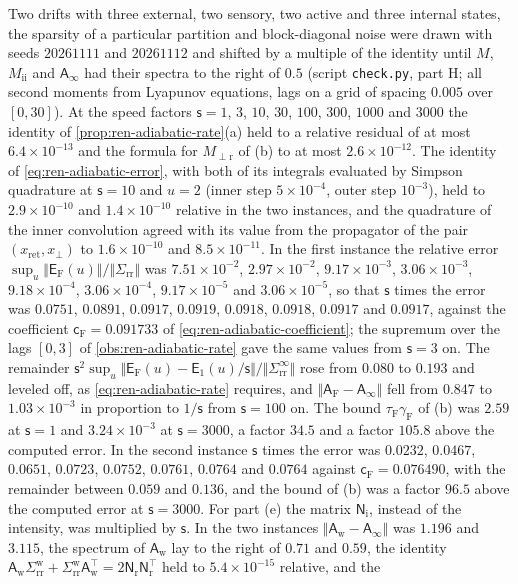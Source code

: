 \begin{numcheck}\label{chk:ren-adiabatic-rate}
Two drifts with three external, two sensory, two active and three internal states, the sparsity of a particular partition and block-diagonal noise were drawn with seeds $20261111$ and $20261112$ and shifted by a multiple of the identity until $M$, $M_{\mathrm{ii}}$ and $\mathsf A_\infty$ had their spectra to the right of $0.5$ (script \texttt{check.py}, part H; all second moments from Lyapunov equations, lags on a grid of spacing $0.005$ over $[0,30]$). At the speed factors $\mathsf s=1$, $3$, $10$, $30$, $100$, $300$, $1000$ and $3000$ the identity of \cref{prop:ren-adiabatic-rate}(a) held to a relative residual of at most $6.4\times10^{-13}$ and the formula for $M_{\perp\mathrm r}$ of (b) to at most $2.6\times10^{-12}$. The identity of \eqref{eq:ren-adiabatic-error}, with both of its integrals evaluated by Simpson quadrature at $\mathsf s=10$ and $u=2$ (inner step $5\times10^{-4}$, outer step $10^{-3}$), held to $2.9\times10^{-10}$ and $1.4\times10^{-10}$ relative in the two instances, and the quadrature of the inner convolution agreed with its value from the propagator of the pair $(x_{\mathrm{ret}},x_\perp)$ to $1.6\times10^{-10}$ and $8.5\times10^{-11}$. In the first instance the relative error $\sup_u\Vert\mathsf E_{\mathrm F}(u)\Vert/\Vert\Sigma_{\mathrm{rr}}\Vert$ was $7.51\times10^{-2}$, $2.97\times10^{-2}$, $9.17\times10^{-3}$, $3.06\times10^{-3}$, $9.18\times10^{-4}$, $3.06\times10^{-4}$, $9.17\times10^{-5}$ and $3.06\times10^{-5}$, so that $\mathsf s$ times the error was $0.0751$, $0.0891$, $0.0917$, $0.0919$, $0.0918$, $0.0918$, $0.0917$ and $0.0917$, against the coefficient $\mathsf c_{\mathrm F}=0.091733$ of \eqref{eq:ren-adiabatic-coefficient}; the supremum over the lags $[0,3]$ of \cref{obs:ren-adiabatic-rate} gave the same values from $\mathsf s=3$ on. The remainder $\mathsf s^2\sup_u\Vert\mathsf E_{\mathrm F}(u)-\mathsf E_1(u)/\mathsf s\Vert/\Vert\Sigma^\infty_{\mathrm{rr}}\Vert$ rose from $0.080$ to $0.193$ and leveled off, as \eqref{eq:ren-adiabatic-rate} requires, and $\Vert\mathsf A_{\mathrm F}-\mathsf A_\infty\Vert$ fell from $0.847$ to $1.03\times10^{-3}$ in proportion to $1/\mathsf s$ from $\mathsf s=100$ on. The bound $\tau_{\mathrm F}\gamma_{\mathrm F}$ of (b) was $2.59$ at $\mathsf s=1$ and $3.24\times10^{-3}$ at $\mathsf s=3000$, a factor $34.5$ and a factor $105.8$ above the computed error. In the second instance $\mathsf s$ times the error was $0.0232$, $0.0467$, $0.0651$, $0.0723$, $0.0752$, $0.0761$, $0.0764$ and $0.0764$ against $\mathsf c_{\mathrm F}=0.076490$, with the remainder between $0.059$ and $0.136$, and the bound of (b) was a factor $96.5$ above the computed error at $\mathsf s=3000$. For part (e) the matrix $\mathsf N_{\mathrm i}$, instead of the intensity, was multiplied by $\mathsf s$. In the two instances $\Vert\mathsf A_{\mathrm w}-\mathsf A_\infty\Vert$ was $1.196$ and $3.115$, the spectrum of $\mathsf A_{\mathrm w}$ lay to the right of $0.71$ and $0.59$, the identity $\mathsf A_{\mathrm w}\Sigma^{\mathrm w}_{\mathrm{rr}}+\Sigma^{\mathrm w}_{\mathrm{rr}}\mathsf A_{\mathrm w}^\top=2\mathsf N_{\mathrm r}\mathsf N_{\mathrm r}^\top$ held to $5.4\times10^{-15}$ relative, and the 
\end{numcheck}
